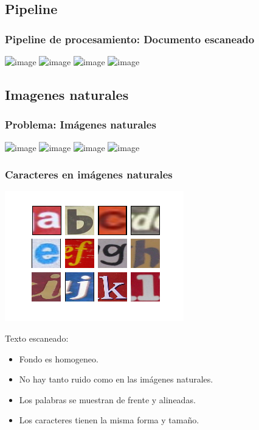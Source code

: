 	\subsection{Pipeline}
		\begin{frame}
			\frametitle{Pipeline de procesamiento: Documento escaneado}
			\begin{center}
				\includegraphics<1>[height=0.65\paperheight]{imgs/texto_plano.png}
				\includegraphics<2>[height=0.65\paperheight]{imgs/texto_plano_det_texto.png}
				\includegraphics<3>[height=0.65\paperheight]{imgs/texto_plano_det_palabras.png}	
				\includegraphics<4>[height=0.65\paperheight]{imgs/texto_plano_det_caracteres.png}
			\end{center}
		\end{frame}
	\subsection{Imagenes naturales}
		\begin{frame}
			\frametitle{Problema: Imágenes naturales}
			\begin{center}
				\includegraphics<1>[height=0.65\paperheight]{imgs/imagen_natural_1.jpg}
				\includegraphics<2>[height=0.65\paperheight]{imgs/imagen_natural_2.jpg}
				\includegraphics<3>[height=0.65\paperheight]{imgs/imagen_natural_3.jpg}
				\includegraphics<4>[height=0.65\paperheight]{imgs/imagen_natural_4.jpg}	
			\end{center}
		\end{frame}
		\begin{frame}
			\frametitle{Caracteres en imágenes naturales}
			\includegraphics[height=0.65\paperheight]{imgs/caracteres_naturales.png}	
		\end{frame}
		\begin{frame}
			Texto escaneado:
			\begin{itemize}
				\item Fondo es homogeneo.
				\item No hay tanto ruido como en las imágenes naturales.
				\item Los palabras se muestran de frente y alineadas.
				\item Los caracteres tienen la misma forma y tamaño.
			\end{itemize}
		\end{frame}
